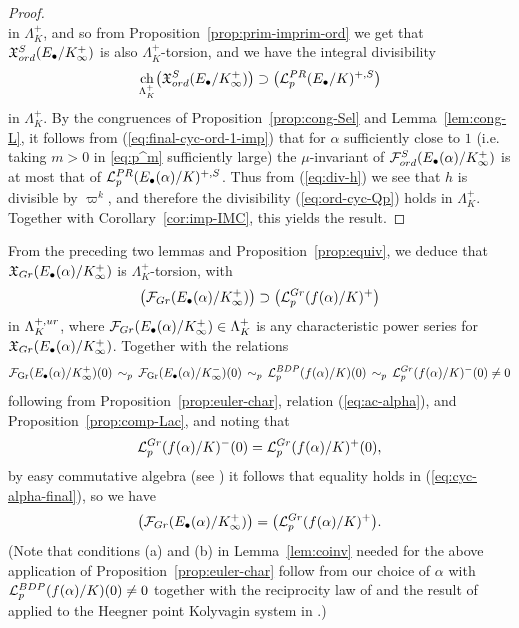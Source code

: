 \documentclass[a4paper,10pt]{amsart}
\numberwithin{equation}{section}
\numberwithin{equation}{section}
\theoremstyle{plain}
\theoremstyle{definition}
\theoremstyle{definition}
\theoremstyle{plain}
\theoremstyle{plain}
\theoremstyle{plain}
\theoremstyle{plain}
\newcommand{\X}{\mathfrak{X}}
\DeclareMathOperator{\ch}{ch}
\DeclareMathOperator{\Gr}{Gr}
\newcommand{\Lcal}{\mathcal{L}}
\newcommand{\Fcal}{\mathcal{F}}
\begin{document}
\begin{proof}
\begin{equation}
\end{equation}
in $\Lambda_K^+$, and so from Proposition~\ref{prop:prim-imprim-ord} we get that $\X_{\rm ord}^S(E_\bullet/K_\infty^+)$ is also $\Lambda_K^+$-torsion, and we have the integral divisibility
\begin{equation}\label{eq:final-cyc-ord-1-imp}
\ch_{\Lambda_K^+}\bigl(\X_{\rm ord}^S(E_\bullet/K_\infty^+)\bigr)\supset\bigl(\Lcal_p^{\rm PR}(E_\bullet/K)^{+,S}\bigr)
\end{equation}
in $\Lambda_K^+$. By the congruences of Proposition~\ref{prop:cong-Sel} and Lemma~\ref{lem:cong-L}, it follows from (\ref{eq:final-cyc-ord-1-imp}) that for $\alpha$ sufficiently close to $1$ (i.e. taking $m>0$ in \eqref{eq:p^m} sufficiently large) the $\mu$-invariant of $\Fcal_{\rm ord}^S(E_\bullet(\alpha)/K_\infty^+)$ is at most that of $\Lcal_p^{\rm PR}(E_\bullet(\alpha)/K)^{+,S}$. Thus from (\ref{eq:div-h}) we see that $h$ is divisible by $\varpi^k$, and therefore the divisibility (\ref{eq:ord-cyc-Qp}) holds in $\Lambda_K^+$.  Together with Corollary~\ref{cor:imp-IMC}, this yields the result.
\end{proof}

From the preceding two lemmas and Proposition~\ref{prop:equiv}, we deduce that $\X_{\rm Gr}(E_\bullet(\alpha)/K_\infty^+)$ is $\Lambda_K^+$-torsion, with
\begin{equation}\label{eq:cyc-alpha-final}
\bigl(\Fcal_{\rm Gr}(E_\bullet(\alpha)/K_\infty^+)\bigr)\supset\bigl(\Lcal_p^{\rm Gr}(f(\alpha)/K)^+\bigr)
\end{equation}
in $\Lambda_K^{+,\rm ur}$, where $\Fcal_{\rm Gr}(E_\bullet(\alpha)/K_\infty^+)\in\Lambda_K^+$ is any characteristic power series for $\X_{\rm Gr}(E_\bullet(\alpha)/K_\infty^+)$. Together with the relations
\[
\Fcal_{\Gr}(E_\bullet(\alpha)/K_\infty^+)(0)\,\sim_p\,
\Fcal_{\Gr}(E_\bullet(\alpha)/K_\infty^-)(0)\,\sim_p\,\Lcal_p^{\rm BDP}(f(\alpha)/K)(0)\,\sim_p\,\Lcal_p^{\rm Gr}(f(\alpha)/K)^-(0)\neq 0
\]
following from Proposition~\ref{prop:euler-char}, relation (\ref{eq:ac-alpha}), and Proposition~\ref{prop:comp-Lac}, and noting that 
\[
\Lcal_p^{\rm Gr}(f(\alpha)/K)^-(0)=\Lcal_p^{\rm Gr}(f(\alpha)/K)^+(0),
\]
by easy commutative algebra (see \cite[Lem.\,3.2]{skinner-urban}) it follows that equality holds in (\ref{eq:cyc-alpha-final}), so we have
\[
\bigl(\Fcal_{\rm Gr}(E_\bullet(\alpha)/K_\infty^+)\bigr)=\bigl(\Lcal_p^{\rm Gr}(f(\alpha)/K)^+\bigr).
\]
(Note that conditions (a) and (b) in Lemma~\ref{lem:coinv} needed for the above application of Proposition~\ref{prop:euler-char} follow from our choice of $\alpha$ with $\Lcal_p^{\rm BDP}(f(\alpha)/K)(0)\neq 0$ together with the reciprocity law of \cite[Thm.\,5.7]{cas-hsieh1} and the result of \cite[Thm.\,3.2.1]{eisenstein} applied to the Heegner point Kolyvagin system in \cite[\S{4.1}]{eisenstein}.) 
\end{document}

